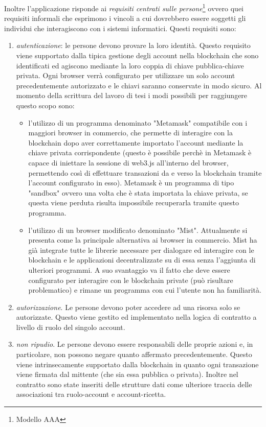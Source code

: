 Inoltre l'applicazione risponde ai \emph{requisiti centrati sulle persone}\footnote{Modello AAA} ovvero quei requisiti informali che esprimono i vincoli a cui dovrebbero essere soggetti gli individui che interagiscono con i sistemi informatici. Questi requisiti sono:
\begin{enumerate}
	\item \emph{autenticazione}: le persone devono provare la loro identità. Questo requisito viene supportato dalla tipica gestione degli account nella blockchain che sono identificati ed agiscono mediante la loro coppia di chiave pubblica-chiave privata. Ogni browser verrà configurato per utilizzare un solo account precedentemente autorizzato e le chiavi saranno conservate in modo sicuro. Al momento della scrittura del lavoro di tesi i modi possibili per raggiungere questo scopo sono:
	      \begin{itemize}
	      	\item  l'utilizzo di un programma denominato "Metamask" compatibile con i maggiori browser in commercio, che permette di interagire con la blockchain dopo aver correttamente importato l'account mediante la chiave privata corrispondente (questo è possibile perchè in Metamask è capace di iniettare la sessione di web3.js all'interno del browser, permettendo così di effettuare transazioni da e verso la blockchain tramite l'account configurato in esso). Metamask è un programma di tipo "sandbox" ovvero una volta che è stata importata la chiave privata, se questa viene perduta risulta impossibile recuperarla tramite questo programma. 
	      	\item l'utilizzo di un browser modificato denominato "Mist". Attualmente si presenta come la principale alternativa ai browser in commercio. Mist ha già integrate tutte le librerie necessare per dialogare ed interagire con le blockchain e le applicazioni decentralizzate su di essa senza l'aggiunta di ulteriori programmi. A suo svantaggio va il fatto che deve essere configurato per interagire con le blockchain private (può risultare problematico) e rimane un programma con cui l'utente non ha familiarità.
	      \end{itemize}
	\item \emph{autorizzazione}. Le persone devono poter accedere ad una risorsa solo se autorizzate. Questo viene gestito ed implementato nella logica di contratto a livello di ruolo del singolo account.
	\item \emph{non ripudio}. Le persone devono essere responsabili delle proprie azioni e, in particolare, non possono negare quanto affermato precedentemente. Questo viene intrinsecamente supportato dalla blockchain in quanto ogni transazione viene firmata dal mittente (che sia essa pubblica o privata). Inoltre nel contratto sono state inseriti delle strutture dati come ulteriore traccia delle associazioni tra ruolo-account e account-ricetta.
\end{enumerate}
%
